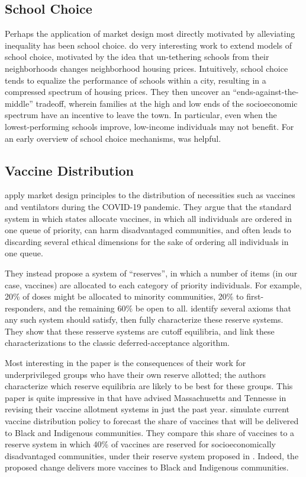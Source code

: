 \documentclass[JEL]{AEA}
\begin{document}
\subsection{School Choice}

Perhaps the application of market design most directly motivated by alleviating inequality has been school choice. \cite{avery-2020} do very interesting work to extend models of school choice, motivated by the idea that un-tethering schools from their neighborhoods changes neighborhood housing prices. Intuitively, school choice tends to equalize the performance of schools within a city, resulting in a compressed spectrum of housing prices. They then uncover an ``ends-against-the-middle'' tradeoff, wherein families at the high and low ends of the socioeconomic spectrum have an incentive to leave the town. In particular, even when the lowest-performing schools improve, low-income individuals may not benefit. For an early overview of school choice mechanisms, \cite{pathak-2011} was helpful.

\subsection{Vaccine Distribution}

\cite{pathak-2020} apply market design principles to the distribution of necessities such as vaccines and ventilators during the COVID-19 pandemic. They argue that the standard system in which states allocate vaccines, in which all individuals are ordered in one queue of priority, can harm disadvantaged communities, and often leads to discarding several ethical dimensions for the sake of ordering all individuals in one queue.

They instead propose a system of ``reserves'', in which a number of items (in our case, vaccines) are allocated to each category of priority individuals. For example, 20\% of doses might be allocated to minority communities, 20\% to first-responders, and the remaining 60\% be open to all. \cite{pathak-2020}  identify several axioms that any such system should satisfy, then fully characterize these reserve systems. They show that these resserve systems are cutoff equilibria, and link these characterizations to the classic deferred-acceptance algorithm. 

Most interesting in the paper is the consequences of their work for underprivileged groups who have their own reserve allotted; the authors characterize which reserve equilibria are likely to be best for these groups. This paper is quite impressive in that \cite{pathak-2020} have advised Massachusetts and Tennesse in revising their vaccine allotment systems in just the past year. \cite{pathak-2020b} simulate current vaccine distribution policy to forecast the share of vaccines that will be delivered to Black and Indigenous communities. They compare this share of vaccines to a reserve system in which 40\% of vaccines are reserved for socioeconomically disadvantaged communities, under their reserve system proposed in \cite{pathak-2020}. Indeed, the proposed change delivers more vaccines to Black and Indigenous communities.  
\end{document}

